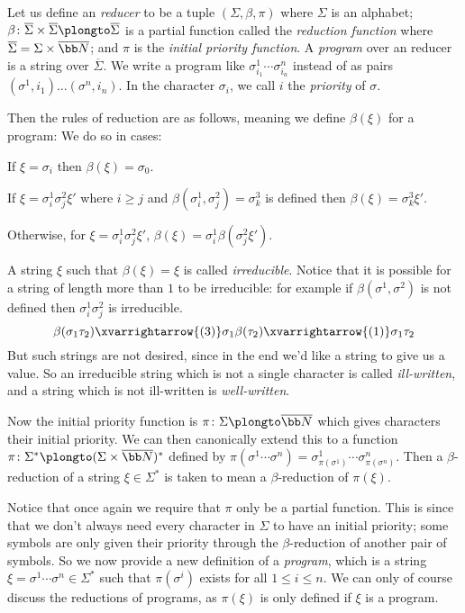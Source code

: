Let us define an {\it reducer} to be a tuple $(\Sigma,\beta,\pi)$ where $\Sigma$ is an alphabet; $\beta\colon\overline\Sigma\times\overline\Sigma\plongto\overline\Sigma$ is a partial function called the
{\it reduction function} where $\overline\Sigma=\Sigma\times\overline{\bb N}$; and $\pi$ is the {\it initial priority function}.
A {\it program} over an reducer is a string over $\overline\Sigma$.
We write a program like $\sigma^1_{i_1}\cdots\sigma^n_{i_n}$ instead of as pairs $(\sigma^1,i_1)\dots(\sigma^n,i_n)$.
In the character $\sigma_i$, we call $i$ the {\it priority} of $\sigma$.

Then the rules of reduction are as follows, meaning we define $\beta(\xi)$ for a program:
We do so in cases:
\benum
    \item If $\xi=\sigma_i$ then $\beta(\xi)=\sigma_0$.
    \item If $\xi=\sigma^1_i\sigma^2_j\xi'$ where $i\geq j$ and $\beta(\sigma^1_i,\sigma^2_j)=\sigma^3_k$ is defined then $\beta(\xi)=\sigma^3_k\xi'$.
    \item Otherwise, for $\xi=\sigma^1_i\sigma^2_j\xi'$, $\beta(\xi)=\sigma^1_i\beta(\sigma^2_j\xi')$.
\eenum

A string $\xi$ such that $\beta(\xi)=\xi$ is called {\it irreducible}.
Notice that it is possible for a string of length more than $1$ to be irreducible: for example if $\beta(\sigma^1,\sigma^2)$ is not defined then $\sigma^1_i\sigma^2_j$ is irreducible.
$$ \beta(\sigma_1\tau_2)\xvarrightarrow{(3)}\sigma_1\beta(\tau_2)\xvarrightarrow{(1)}\sigma_1\tau_2 $$
But such strings are not desired, since in the end we'd like a string to give us a value.
So an irreducible string which is not a single character is called {\it ill-written}, and a string which is not ill-written is {\it well-written}.

Now the initial priority function is $\pi\colon\Sigma\plongto\overline{\bb N}$ which gives characters their initial priority.
We can then canonically extend this to a function $\pi\colon\Sigma^*\plongto(\Sigma\times\overline{\bb N})^*$ defined by $\pi(\sigma^1\cdots\sigma^n)=\sigma^1_{\pi(\sigma^1)}\cdots\sigma^n_{\pi(\sigma^n)}$.
Then a $\beta$-reduction of a string $\xi\in\Sigma^*$ is taken to mean a $\beta$-reduction of $\pi(\xi)$.

Notice that once again we require that $\pi$ only be a partial function.
This is since that we don't always need every character in $\Sigma$ to have an initial priority; some symbols are only given their priority through the $\beta$-reduction of another pair of symbols.
So we now provide a new definition of a {\it program}, which is a string $\xi=\sigma^1\cdots\sigma^n\in\Sigma^*$ such that $\pi(\sigma^i)$ exists for all $1\leq i\leq n$.
We can only of course discuss the reductions of programs, as $\pi(\xi)$ is only defined if $\xi$ is a program.

